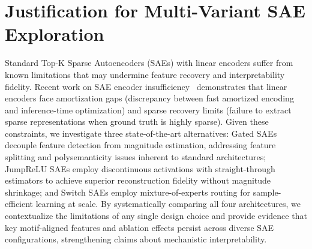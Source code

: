 
\section*{Justification for Multi-Variant SAE Exploration}

Standard Top-K Sparse Autoencoders (SAEs) with linear encoders suffer from known limitations that may undermine feature recovery and interpretability fidelity. Recent work on SAE encoder insufficiency~\cite{rajamanoharan2024sae} demonstrates that linear encoders face amortization gaps (discrepancy between fast amortized encoding and inference-time optimization) and sparse recovery limits (failure to extract sparse representations when ground truth is highly sparse). Given these constraints, we investigate three state-of-the-art alternatives: Gated SAEs decouple feature detection from magnitude estimation, addressing feature splitting and polysemanticity issues inherent to standard architectures; JumpReLU SAEs employ discontinuous activations with straight-through estimators to achieve superior reconstruction fidelity without magnitude shrinkage; and Switch SAEs employ mixture-of-experts routing for sample-efficient learning at scale. By systematically comparing all four architectures, we contextualize the limitations of any single design choice and provide evidence that key motif-aligned features and ablation effects persist across diverse SAE configurations, strengthening claims about mechanistic interpretability.


